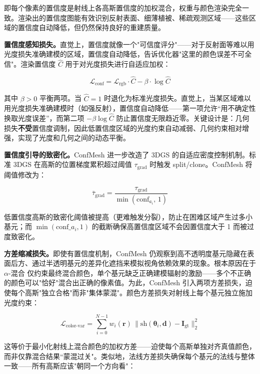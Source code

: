 即每个像素的置信度是射线上各高斯置信度的加权混合，权重与颜色渲染完全一致。渲染出的置信度图能有效识别反射表面、细薄植被、稀疏观测区域——这些区域的置信度自动降低，但仍然保持良好的重建质量。

\textbf{置信度感知损失。}直觉上，置信度就像一个"可信度评分"——对于反射面等难以用光度损失准确建模的区域，置信度自动降低，告诉优化器"这里的颜色误差不可全信"。渲染置信度 $\hat{C}$ 用于对光度损失进行自适应加权：

\begin{equation}
\mathcal{L}_{\text{conf}} = \mathcal{L}_{\text{rgb}} \cdot \hat{C} - \beta \cdot \log \hat{C}
\end{equation}

其中 $\beta > 0$ 平衡两项。当 $\hat{C} = 1$ 时退化为标准光度损失。直觉上，当某区域难以用光度损失准确建模时（如强反射），置信度自动降低——第一项允许“用不确定性换取光度误差”，而第二项 $-\beta \log \hat{C}$ 防止置信度无限趋近零。关键设计是：几何损失\textbf{不受}置信度调制，因此低置信度区域的光度约束自动减弱、几何约束相对增强，实现了光度和几何之间的动态平衡。

\textbf{置信度引导的致密化。}ConfMesh 进一步改造了 3DGS 的自适应密度控制机制。标准 3DGS 在高斯的位置梯度累积超过阈值 $\tau_{\text{grad}}$ 时触发 split/clone。ConfMesh 将阈值修改为：

\begin{equation}
\bar{\tau}_{\text{grad}} = \frac{\tau_{\text{grad}}}{\min(\text{conf}_{a_i},\, 1)}
\end{equation}

低置信度高斯的致密化阈值被提高（更难触发分裂），防止在困难区域产生过多小基元；而 $\min(\text{conf}\_a_i, 1)$ 的截断确保高置信度区域不会因置信度大于 1 而被过度致密化。

\textbf{方差缩减损失。}即使有置信度机制，ConfMesh 仍观察到高不透明度基元隐藏在表面后方、通过半透明基元的差异化遮挡来模拟视角依赖效果的现象。根本原因在于 $\alpha$-混合 仅约束最终混合颜色，单个基元缺乏正确建模辐射的激励——多个不正确的颜色可以"恰好"混合出正确的像素值。为此，ConfMesh 引入两项方差损失，迫使每个高斯"独立合格"而非"集体蒙混"。颜色方差损失对射线上每个基元独立施加光度约束：

\begin{equation}
\mathcal{L}_{\text{color-var}} = \sum_{i=0}^{N-1} w_i(\bm{r})\, \|\text{sh}(\bm{\theta}_i, \bm{d}) - \bm{I}_{\text{gt}}\|_2^2
\end{equation}

这等价于最小化射线上混合颜色的加权方差——迫使每个高斯单独对齐真值颜色，而非仅靠混合结果“蒙混过关"。类似地，法线方差损失确保每个基元的法线与整体一致——所有高斯应该"朝同一个方向看"：

